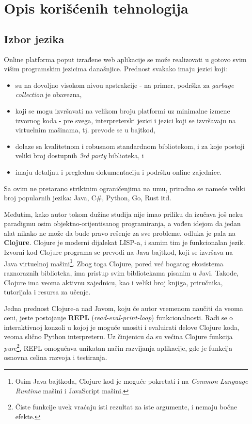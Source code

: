 
\section{Opis korišćenih tehnologija}
\subsection{Izbor jezika}
Online platforma poput izrađene web aplikacije se može realizovati u gotovo svim višim programskim jezicima današnjice. Prednost svakako imaju jezici koji:
\begin{itemize}
\renewcommand\labelitemi{--}
\item su na dovoljno visokom nivou apstrakcije - na primer, podrška za \textit{garbage collection} je obavezna,
\item koji se mogu izvršavati na velikom broju platformi uz minimalne izmene izvornog koda - pre svega, interpreterski jezici i jezici koji se izvršavaju na virtuelnim mašinama, tj. prevode se u bajtkod,
\item dolaze sa kvalitetnom i robusnom standardnom bibliotekom, i za koje postoji veliki broj dostupnih \textit{3rd party} biblioteka, i
\item imaju detaljnu i preglednu dokumentaciju i podršku online zajednice.
\end{itemize}
Sa ovim ne pretarano striktnim ograničenjima na umu, prirodno se nameće veliki broj popularnih jezika: Java, C\#, Python, Go, Rust itd.

Međutim, kako autor tokom dužine studija nije imao priliku da izučava još neku paradigmu osim objektno-orijentisanog programiranja, a vođen idejom da jedan alat nikako ne može da bude pravo rešenje za sve probleme, odluka je pala na \textbf{Clojure}. Clojure je moderni dijalekat LISP-a, i samim tim je funkcionalan jezik. Izvorni kod Clojure programa se prevodi na Java bajtkod, koji se izvršava na Java virtuelnoj mašini\footnote{Osim Java bajtkoda, Clojure kod je moguće pokretati i na \textit{Common Language Runtime} mašini i JavaScript mašini.}. Zbog toga Clojure, pored već bogatog ekosistema raznoraznih biblioteka, ima pristup svim bibliotekama pisanim u Javi. Takođe, Clojure ima veoma aktivnu zajednicu, kao i veliki broj knjiga\cite{Emerick:2012:CP}\cite{Higginbotham:2015:CBT}, priručnika, tutorijala i resursa za učenje.

Jedna prednost Clojure-a nad Javom, koju će autor vremenom naučiti da veoma ceni, jeste postojanje \textbf{REPL} (\textit{read-eval-print-loop}) funkcionalnosti. Radi se o interaktivnoj konzoli u kojoj je moguće unositi i evaluirati delove Clojure koda, veoma slično Python interpreteru. Uz činjenicu da su većina Clojure funkcija \textit{pure}\footnote{Čiste funkcije uvek vraćaju isti rezultat za iste argumente, i nemaju bočne efekte.}, REPL omogućava unikatan način razvijanja aplikacije, gde je funkcija osnovna celina razvoja i testiranja.

